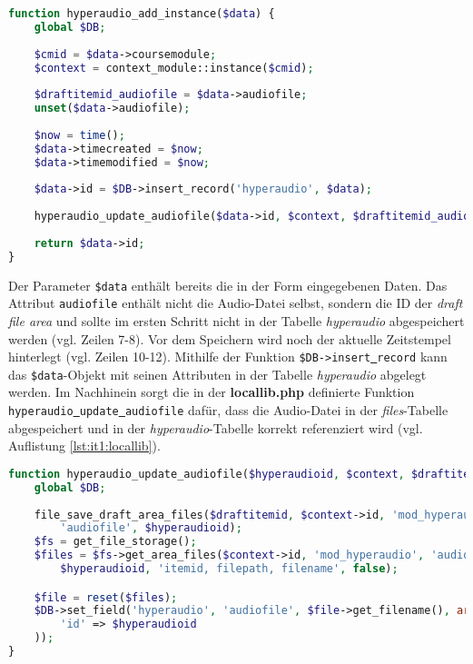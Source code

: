 \begin{lstlisting}[language=php,
             linewidth=\textwidth,
             caption={Ausschnitt der \textbf{lib.php} in der 1. Iteration},
             label={lst:it1:lib}]
function hyperaudio_add_instance($data) {
    global $DB;
    
    $cmid = $data->coursemodule;
    $context = context_module::instance($cmid);
    
    $draftitemid_audiofile = $data->audiofile;
    unset($data->audiofile);
     
    $now = time();
    $data->timecreated = $now;
    $data->timemodified = $now;
    
    $data->id = $DB->insert_record('hyperaudio', $data);
    
    hyperaudio_update_audiofile($data->id, $context, $draftitemid_audiofile);
     
    return $data->id;
}
\end{lstlisting}

Der Parameter \texttt{\$data} enthält bereits die in der Form eingegebenen Daten. Das Attribut \mbox{\texttt{audiofile}} enthält nicht die Audio-Datei selbst, sondern die ID der \textit{draft file area} und sollte im ersten Schritt nicht in der Tabelle \textit{hyperaudio} abgespeichert werden (vgl. Zeilen 7-8). Vor dem Speichern wird noch der aktuelle Zeitstempel hinterlegt (vgl. Zeilen 10-12). Mithilfe der Funktion \mbox{\texttt{\$DB->insert\underline{{ }}record}} kann das \texttt{\$data}-Objekt mit seinen Attributen in der Tabelle \textit{hyperaudio} abgelegt werden. Im Nachhinein sorgt die in der \textbf{locallib.php} definierte Funktion \mbox{\texttt{hyperaudio\underline{{ }}update\underline{{ }}audiofile}} dafür, dass die Audio-Datei in der \textit{files}-Tabelle abgespeichert und in der \textit{hyperaudio}-Tabelle korrekt referenziert wird (vgl. Auflistung \ref{lst:it1:locallib}).

\begin{lstlisting}[language=php,
             linewidth=\textwidth,
             caption={Ausschnitt der \textbf{locallib.php} in der 1. Iteration},
             label={lst:it1:locallib}]
function hyperaudio_update_audiofile($hyperaudioid, $context, $draftitemid) {
    global $DB;
    
    file_save_draft_area_files($draftitemid, $context->id, 'mod_hyperaudio',
        'audiofile', $hyperaudioid);
    $fs = get_file_storage();
    $files = $fs->get_area_files($context->id, 'mod_hyperaudio', 'audiofile',
        $hyperaudioid, 'itemid, filepath, filename', false);

    $file = reset($files);
    $DB->set_field('hyperaudio', 'audiofile', $file->get_filename(), array(
        'id' => $hyperaudioid
    ));
}
\end{lstlisting}

